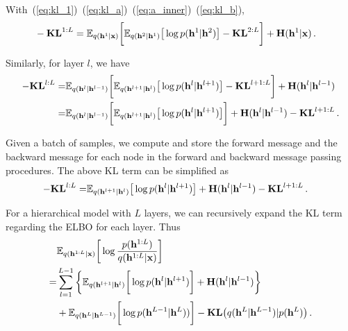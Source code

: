 \documentclass[twoside]{article}
\begin{document}
With~(\ref{eq:kl_1})~(\ref{eq:kl_a})~(\ref{eq:a_inner})~(\ref{eq:kl_b}), 
\begin{align*}
&-\textbf{\text{KL}}^{1:L} =    \mathbb{E}_{q(\mathbf{h}^{1}|\mathbf{x})} \bigg[  \mathbb{E}_{q(\mathbf{h}^{2}|\mathbf{h}^1)} \big[ \log p( \mathbf{h}^{1}|  \mathbf{h}^{2})    \big]  - \textbf{\text{KL}}^{2:L}  \bigg] +  \textbf{\text{H}}(\mathbf{h}^{1}|\mathbf{x}) \, .
\end{align*}

Similarly, for layer $l$, we  have 
\begin{align*} %
-\textbf{\text{KL}}^{l:L} 
=  & \mathbb{E}_{q(\mathbf{h}^{l}|\mathbf{h}^{l-1})} \bigg[  \mathbb{E}_{q(\mathbf{h}^{l+1}|\mathbf{h}^l)} \big[ \log p( \mathbf{h}^{l}|  \mathbf{h}^{l+1})    \big]  - \textbf{\text{KL}}^{l+1:L}  \bigg]   +  \textbf{\text{H}}(\mathbf{h}^{l}|\mathbf{h}^{l-1}) \\ \notag
=&    \mathbb{E}_{q(\mathbf{h}^{l}|\mathbf{h}^{l-1})} \bigg[  \mathbb{E}_{q(\mathbf{h}^{l+1}|\mathbf{h}^l)} \big[ \log p( \mathbf{h}^{l}|  \mathbf{h}^{l+1})    \big]   \bigg] +  \textbf{\text{H}}(\mathbf{h}^{l}|\mathbf{h}^{l-1})  - \textbf{\text{KL}}^{l+1:L} \, .
\end{align*}

Given a batch of samples, we compute  and store the forward message and the backward message for each node in the forward and backward message passing procedures.  
The above KL term can be simplified as
\begin{align} \label{eq:KL_tree}
-\textbf{\text{KL}}^{l:L} 
=&     \mathbb{E}_{q(\mathbf{h}^{l+1}|\mathbf{h}^l)} \big[ \log p( \mathbf{h}^{l}|  \mathbf{h}^{l+1})    \big]  +  \textbf{\text{H}}(\mathbf{h}^{l}|\mathbf{h}^{l-1})   - \textbf{\text{KL}}^{l+1:L} \, .
\end{align}


For a hierarchical model with $L$ layers, we can recursively expand the KL term regarding the ELBO for each layer.  Thus 
\begin{align} \label{eq:KL_all}
& \mathbb{E}_{q(\mathbf{h}^{1:L} | \mathbf{x})} \bigg[ \log  \frac{p( \mathbf{h}^{1:L})}{q(\mathbf{h}^{1:L}|\mathbf{x})}  \bigg] \\ \notag
=& \sum_{l=1}^{L-1} \bigg\{   \mathbb{E}_{q(\mathbf{h}^{l+1}|\mathbf{h}^l)} \bigg[ \log p( \mathbf{h}^{l}|  \mathbf{h}^{l+1})   \bigg]  +    \textbf{\text{H}}(\mathbf{h}^l | \mathbf{h}^{l-1} )  \bigg\} \\ \notag
&+  \mathbb{E}_{q(\mathbf{h}^L|\mathbf{h}^{L-1})} \bigg[ \log p( \mathbf{h}^{L-1}|  \mathbf{h}^L) )  \bigg]    -   \textbf{\text{KL}}\big(q(\mathbf{h}^L | \mathbf{h}^{L-1} )   | p(\mathbf{h}^L)  \big) \, .
 \end{align}
\end{document}
